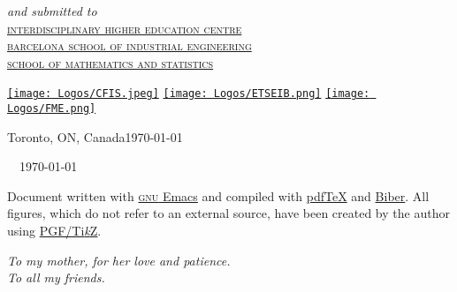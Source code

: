 \begin{titlepage}
  \large
  \textsl{and submitted to}\Large\\[-.25ex]
  \scshape
  \href{https://cfis.upc.edu/en}{interdisciplinary higher education centre}\\[-.5ex]
  \href{https://etseib.upc.edu/en}{barcelona school of industrial engineering}\\[-.5ex]
  \href{https://fme.upc.edu/en}{school of mathematics and statistics}


  \vfill
  \href{https://cfis.upc.edu/en}{\texttt{[image: Logos/CFIS.jpeg]}}
  \hspace{1em}
  \href{https://etseib.upc.edu/en}{\texttt{[image: Logos/ETSEIB.png]}}
  \hspace{1em}
  \href{https://fme.upc.edu/en}{\texttt{[image: Logos/FME.png]}}\\[1ex]

  \vfill

  \normalsize
  Toronto, ON, Canada\hfill\today
\end{titlepage}


\thispagestyle{empty}
\small
\null\vfill

\begin{center}
  \tikzset{external/export = false}
\end{center}

\vspace{1ex}
\noindent\makeatletter\@author\makeatother\ \textcopyright\ \today\\
\makeatletter\href{https://recomprehension.com/}{\texttt{\@title}}\makeatother\bigskip

\noindent Document written with
\href{https://www.gnu.org/software/emacs/}{\textsc{gnu} Emacs} and compiled
with \href{http://tug.org/applications/pdftex/}{pdf\TeX{}} and
\href{http://biblatex-biber.sourceforge.net/}{Biber}. All figures, which do not
refer to an external source, have been created by the author using
\href{https://www.ctan.org/pkg/pgf}{PGF/Ti\emph{k}Z}.

\doclicenseThis
\normalsize



\cleardoublepage
\thispagestyle{empty}
\begin{flushright}
  \itshape
  To my mother, for her love and patience. \\
  To all my friends.
\end{flushright}



